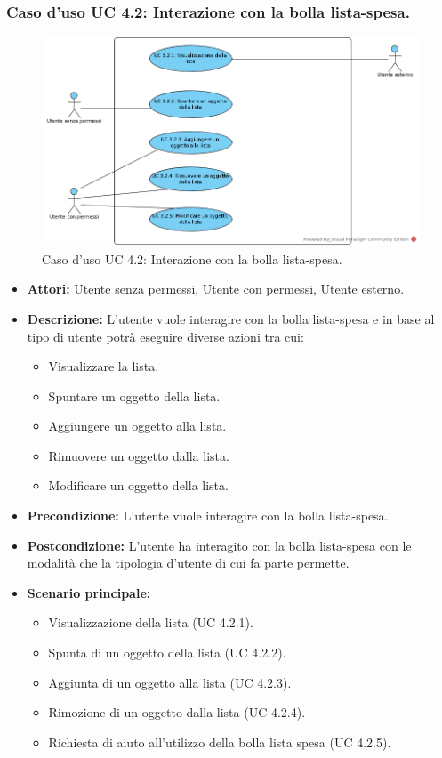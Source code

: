 \subsubsection{Caso d'uso UC 4.2: Interazione con la bolla lista-spesa.}
\label{Caso d'uso UC 4.2: Interazione con la bolla lista-spesa.}
\begin{figure}[ht]
	\centering
	\includegraphics[scale=0.60]{Usecases/img/UC4.2.png}
	\caption{Caso d'uso UC 4.2: Interazione con la bolla lista-spesa.}
\end{figure}

\FloatBarrier
\begin{itemize}
\item \textbf{Attori:} Utente senza permessi, Utente con permessi, Utente esterno.
\item \textbf{Descrizione:} L'utente vuole interagire con la bolla lista-spesa e in base al tipo di utente potrà eseguire diverse azioni tra cui:
\begin{itemize}
\item Visualizzare la lista.
\item Spuntare un oggetto della lista.
\item Aggiungere un oggetto alla lista.
\item Rimuovere un oggetto dalla lista.
\item Modificare un oggetto della lista.
\end{itemize}
\item \textbf{Precondizione:} L'utente vuole interagire con la bolla lista-spesa. 
\item \textbf{Postcondizione:} L'utente ha interagito con la bolla lista-spesa con le modalità che la tipologia d'utente di cui fa parte permette.
\item \textbf{Scenario principale:}
	\begin{itemize}
	\item{Visualizzazione della lista (UC 4.2.1).}
	\item{Spunta di un oggetto della lista (UC 4.2.2).}
	\item{Aggiunta di un oggetto alla lista (UC 4.2.3).}
	\item{Rimozione di un oggetto dalla lista (UC 4.2.4).}
	\item{Richiesta di aiuto all'utilizzo della bolla lista spesa (UC 4.2.5).}
	\end{itemize}
\end{itemize}
